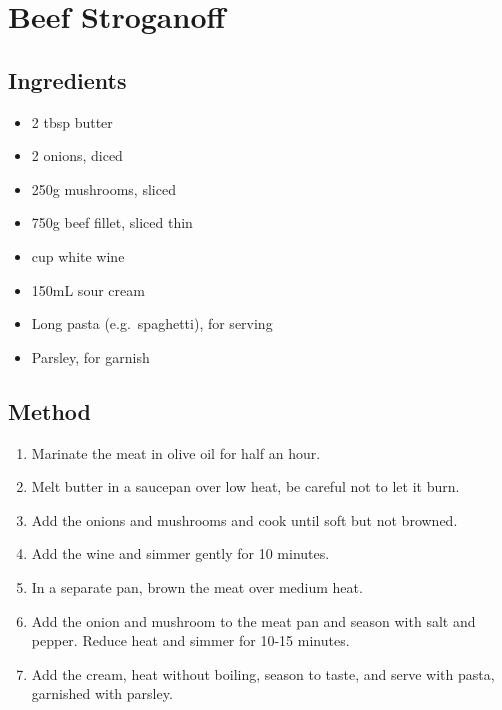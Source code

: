 \clearpage
\section{Beef Stroganoff}


\subsection{Ingredients}

\begin{itemize}
    \item 2 tbsp butter
    \item 2 onions, diced
    \item 250g mushrooms, sliced
    \item 750g beef fillet, sliced thin
    \item {} cup white wine
    \item 150mL sour cream
    \item Long pasta (e.g.\ spaghetti), for serving
    \item Parsley, for garnish
\end{itemize}

\subsection{Method}

\begin{enumerate}
    \item Marinate the meat in olive oil for half an hour.
    \item Melt butter in a saucepan over low heat, be careful not to let it burn.
    \item Add the onions and mushrooms and cook until soft but not browned.
    \item Add the wine and simmer gently for 10 minutes.
    \item In a separate pan, brown the meat over medium heat.
    \item Add the onion and mushroom to the meat pan and season with salt and pepper. Reduce heat and simmer for 10-15 minutes.
    \item Add the cream, heat without boiling, season to taste, and serve with pasta, garnished with parsley.
\end{enumerate}
